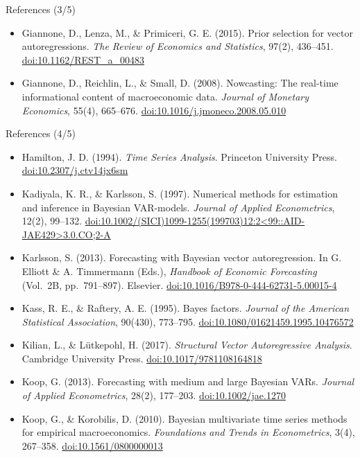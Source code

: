\begin{frame}{References (3/5)}
\begin{itemize}
    \item Giannone, D., Lenza, M., \& Primiceri, G. E. (2015). Prior selection for vector autoregressions. \textit{The Review of Economics and Statistics}, 97(2), 436--451. \href{https://doi.org/10.1162/REST_a_00483}{doi:10.1162/REST\_a\_00483}
    \item Giannone, D., Reichlin, L., \& Small, D. (2008). Nowcasting: The real-time informational content of macroeconomic data. \textit{Journal of Monetary Economics}, 55(4), 665--676. \href{https://doi.org/10.1016/j.jmoneco.2008.05.010}{doi:10.1016/j.jmoneco.2008.05.010}
\end{itemize}
\end{frame}

\begin{frame}{References (4/5)}
\itemsize{\tiny}
\begin{itemize}
    \item Hamilton, J. D. (1994). \textit{Time Series Analysis}. Princeton University Press. \href{https://doi.org/10.2307/j.ctv14jx6sm}{doi:10.2307/j.ctv14jx6sm}
    \item Kadiyala, K. R., \& Karlsson, S. (1997). Numerical methods for estimation and inference in Bayesian VAR-models. \textit{Journal of Applied Econometrics}, 12(2), 99--132. \href{https://doi.org/10.1002/(SICI)1099-1255(199703)12:2\%3C99::AID-JAE429\%3E3.0.CO;2-A}{doi:10.1002/(SICI)1099-1255(199703)12:2\textless{}99::AID-JAE429\textgreater{}3.0.CO;2-A}
    \item Karlsson, S. (2013). Forecasting with Bayesian vector autoregression. In G. Elliott \& A. Timmermann (Eds.), \textit{Handbook of Economic Forecasting} (Vol.\ 2B, pp.\ 791--897). Elsevier. \href{https://doi.org/10.1016/B978-0-444-62731-5.00015-4}{doi:10.1016/B978-0-444-62731-5.00015-4}
    \item Kass, R. E., \& Raftery, A. E. (1995). Bayes factors. \textit{Journal of the American Statistical Association}, 90(430), 773--795. \href{https://doi.org/10.1080/01621459.1995.10476572}{doi:10.1080/01621459.1995.10476572}
    \item Kilian, L., \& Lütkepohl, H. (2017). \textit{Structural Vector Autoregressive Analysis}. Cambridge University Press. \href{https://doi.org/10.1017/9781108164818}{doi:10.1017/9781108164818}
    \item Koop, G. (2013). Forecasting with medium and large Bayesian VARs. \textit{Journal of Applied Econometrics}, 28(2), 177--203. \href{https://doi.org/10.1002/jae.1270}{doi:10.1002/jae.1270}
    \item Koop, G., \& Korobilis, D. (2010). Bayesian multivariate time series methods for empirical macroeconomics. \textit{Foundations and Trends in Econometrics}, 3(4), 267--358. \href{https://doi.org/10.1561/0800000013}{doi:10.1561/0800000013}

\end{itemize}
\end{frame}

